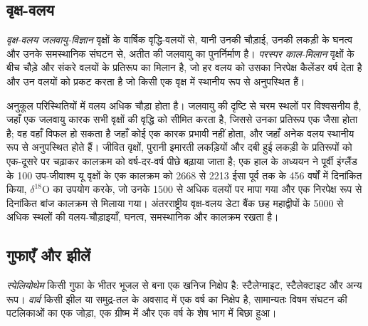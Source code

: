 \subsection*{वृक्ष-वलय}

\begin{definition}\label{def:b2:climate-proxies:dendro}
\emph{वृक्ष-वलय जलवायु-विज्ञान} वृक्षों के वार्षिक वृद्धि-वलयों से, यानी
उनकी चौड़ाई, उनकी लकड़ी के घनत्व और उनके समस्थानिक संघटन से, अतीत की जलवायु का
पुनर्निर्माण है। \emph{परस्पर काल-मिलान} वृक्षों के बीच चौड़े और
संकरे वलयों के प्रतिरूप का मिलान है, जो हर वलय को उसका निरपेक्ष कैलेंडर वर्ष देता है और उन
वलयों को प्रकट करता है जो किसी एक वृक्ष में स्थानीय रूप से अनुपस्थित हैं।
\end{definition}

अनुकूल परिस्थितियों में वलय अधिक चौड़ा होता है।  जलवायु की दृष्टि से चरम स्थलों पर विश्वसनीय है, जहाँ एक
जलवायु कारक सभी वृक्षों की वृद्धि को सीमित करता है, जिससे उनका प्रतिरूप एक जैसा होता है; वह वहाँ
विफल हो सकता है जहाँ कोई एक कारक प्रभावी नहीं होता, और जहाँ अनेक वलय स्थानीय रूप से अनुपस्थित होते हैं।
जीवित वृक्षों, पुरानी इमारती लकड़ियों और दबी हुई लकड़ी के प्रतिरूपों को एक-दूसरे पर चढ़ाकर कालक्रम को
वर्ष-दर-वर्ष पीछे बढ़ाया जाता है; एक हाल के अध्ययन ने पूर्वी इंग्लैंड के 100 उप-जीवाश्म यू वृक्षों के एक कालक्रम को
2668 से 2213 ईसा पूर्व तक के 456 वर्षों में दिनांकित किया, $\delta^{18}$O का उपयोग करके, जो उनके \num{1500} से अधिक वलयों पर
मापा गया और एक निरपेक्ष रूप से दिनांकित बांज कालक्रम से मिलाया गया। अंतरराष्ट्रीय वृक्ष-वलय डेटा बैंक छह महाद्वीपों के
\num{5000} से अधिक स्थलों की वलय-चौड़ाइयाँ, घनत्व, समस्थानिक और कालक्रम रखता है।

\subsection*{गुफाएँ और झीलें}

\begin{definition}[स्पेलियोथेम; वार्व]\label{def:b2:climate-proxies:archives}
\emph{स्पेलियोथेम} किसी गुफा के भीतर भूजल से बना एक खनिज
निक्षेप है: स्टैलेग्माइट, स्टैलेक्टाइट और अन्य रूप। \emph{वार्व}
किसी झील या समुद्र-तल के अवसाद में एक वर्ष का निक्षेप है, सामान्यतः विषम संघटन की
पटलिकाओं का एक जोड़ा, एक ग्रीष्म में और एक वर्ष के शेष भाग में बिछा हुआ।
\end{definition}

